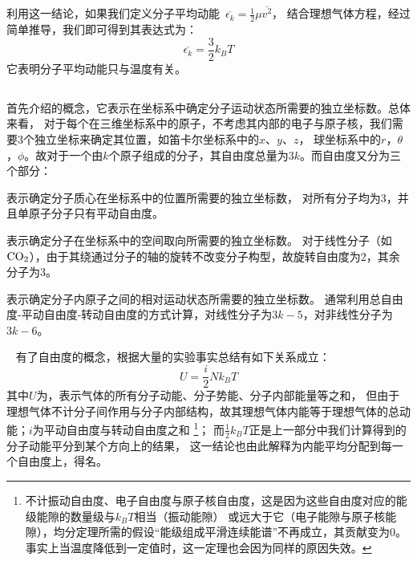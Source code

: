             利用这一结论，如果我们定义分子平均动能\ $\overline{\epsilon_{k}} = \frac{1}{2} \mu \overline{v^{2}}$，
            结合理想气体方程，经过简单推导，我们即可得到其表达式为：
            \begin{equation}
                \overline{\epsilon_{k}} = \frac{3}{2}k_{B}T
                \nonumber
            \end{equation}
            它表明分子平均动能只与温度有关。
        \subsection[能量均分原理]{}
            首先介绍的概念，它表示在坐标系中确定分子运动状态所需要的独立坐标数。总体来看，
            对于每个在三维坐标系中的原子，不考虑其内部的电子与原子核，我们需要3个独立坐标来确定其位置，如笛卡尔坐标系中的$x$、$y$、$z$，
            球坐标系中的$r$，$\theta$，$\phi$。故对于一个由$k$个原子组成的分子，其自由度总量为$3k$。而自由度又分为三个部分：
            \begin{Itemize}
                \item {}表示确定分子质心在坐标系中的位置所需要的独立坐标数，
                对所有分子均为3，并且单原子分子只有平动自由度。
                \item {}表示确定分子在坐标系中的空间取向所需要的独立坐标数。
                对于线性分子（如$\rm{CO_{2}}$），由于其绕通过分子的轴的旋转不改变分子构型，故旋转自由度为2，其余分子为3。
                \item {}表示确定分子内原子之间的相对运动状态所需要的独立坐标数。
                通常利用总自由度-平动自由度-转动自由度的方式计算，对线性分子为$3k-5$，对非线性分子为$3k-6$。
            \end{Itemize}
            \ \newline 
            有了自由度的概念，根据大量的实验事实总结有如下关系成立：
            \begin{equation}
                U = \frac{i}{2}Nk_{B}T
                \nonumber
            \end{equation}
            其中$U$为，表示气体的所有分子动能、分子势能、分子内部能量等之和，
            但由于理想气体不计分子间作用与分子内部结构，故其理想气体内能等于理想气体的总动能；$i$为平动自由度与转动自由度之和
            \footnote{不计振动自由度、电子自由度与原子核自由度，这是因为这些自由度对应的能级能隙的数量级与$k_{B}T$相当（振动能隙）
            或远大于它（电子能隙与原子核能隙），均分定理所需的假设“能级组成平滑连续能谱”不再成立，其贡献变为0。
            事实上当温度降低到一定值时，这一定理也会因为同样的原因失效。}；
            而$\frac{1}{2}k_{B}T$正是上一部分中我们计算得到的分子动能平分到某个方向上的结果，
            这一结论也由此解释为内能平均分配到每一个自由度上，得名。

